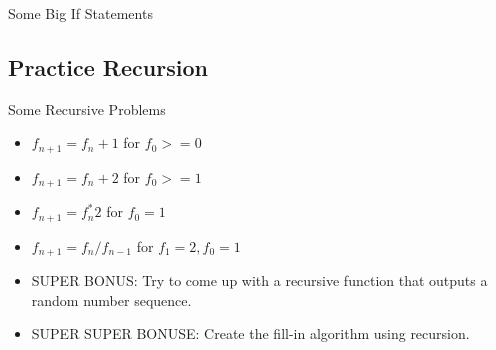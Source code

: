 \begin{frame}[fragile]{Some Big If Statements}
\begin{semiverbatim}\end{semiverbatim}

\end{frame}

\subsection{Practice Recursion}
\begin{frame}{Some Recursive Problems}
\begin{itemize}
\item $f_{n+1} = f_n + 1$ for $f_0 >= 0$
\item $f_{n+1} = f_n + 2$ for $f_0 >= 1$
\item $f_{n+1} = f_n ^* 2$ for $f_0 = 1$
\item $f_{n+1} = f_n / f_{n - 1}$ for $f_1 = 2, f_0 = 1$ \pause
\item SUPER BONUS: Try to come up with a recursive function that outputs a random number sequence.  \pause
\item SUPER SUPER BONUSE: Create the fill-in algorithm using recursion.
\end{itemize}
\end{frame} 
